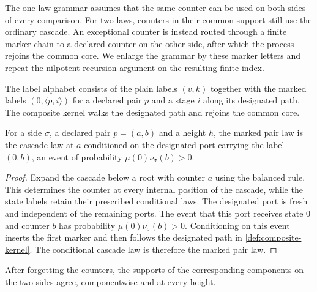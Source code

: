 The one-law grammar assumes that the same counter can be used on both sides of every comparison.
For two laws, counters in their common support still use the ordinary cascade. An exceptional
counter is instead routed through a finite marker chain to a declared counter on the other side,
after which the process rejoins the common core. We enlarge the grammar by these marker letters
and repeat the nilpotent-recursion argument on the resulting finite index.

\begin{definition}
\label{def:composite-kernel}
\leanok
{}
The label alphabet consists of the plain labels $(v,k)$ together with the marked labels
$(0,\langle p,i\rangle)$ for a declared pair $p$ and a stage $i$ along its designated path. The
composite kernel walks the designated path and rejoins the common core.
\end{definition}

\begin{lemma}
\label{thm:cluster}
\leanok
{}
For a side $\sigma$, a declared pair $p=(a,b)$ and a height $h$, the marked pair law is the
cascade law at $a$ conditioned on the designated port carrying the label $(0,b)$, an event of
probability $\mu(0)\nu_\sigma(b)>0$.
\end{lemma}

\begin{proof}
\leanok
{}
Expand the cascade below a root with counter $a$ using the balanced rule. This determines the
counter at every internal position of the cascade, while the state labels retain their prescribed
conditional laws. The designated port is fresh and independent of the remaining ports. The event
that this port receives state $0$ and counter $b$ has probability
$\mu(0)\nu_\sigma(b)>0$. Conditioning on this event inserts the first marker and then follows
the designated path in \cref{def:composite-kernel}. The conditional cascade law is therefore the
marked pair law.
\end{proof}

\begin{lemma}
\label{thm:support-equality}
\leanok
{}
After forgetting the counters, the supports of the corresponding components on the two sides
agree, componentwise and at every height.
\end{lemma}

